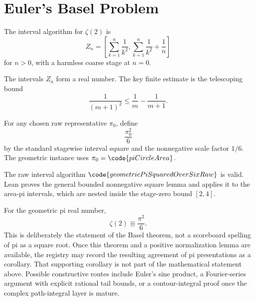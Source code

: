 \section{Euler's Basel Problem}

\begin{definition}\label{def:zeta-two-raw}
The interval algorithm for \(\zeta(2)\) is
\[
  Z_n=
  \left[
    \sum_{k=1}^{n}\frac1{k^2},
    \sum_{k=1}^{n}\frac1{k^2}+\frac1n
  \right]
\]
for \(n>0\), with a harmless coarse stage at \(n=0\).
\end{definition}

\begin{theorem}\label{thm:zeta-two-valid}
\leanok
The intervals \(Z_n\) form a real number.  The key finite estimate is the
telescoping bound
\[
  \frac{1}{(m+1)^2}\le \frac1m-\frac1{m+1}.
\]
\end{theorem}

\begin{definition}\label{def:basel-geometric-rhs}
For any chosen raw representative \(\pi_0\), define
\[
  \frac{\pi_0^2}{6}
\]
by the standard stagewise interval square and the nonnegative scale factor
\(1/6\).  The geometric instance uses \(\pi_0=\code{piCircleArea}\).
\end{definition}

\begin{theorem}
\label{thm:basel-geometric-rhs-valid}
\leanok
The raw interval algorithm \(\code{geometricPiSquaredOverSixRaw}\) is valid.
Lean proves the general bounded nonnegative square lemma and applies it to the
area-pi intervals, which are nested inside the stage-zero bound \([2,4]\).
\end{theorem}

\begin{conjecture}\label{conj:basel}
For the geometric pi real number,
\[
  \zeta(2)\Equiv \frac{\pi^2}{6}.
\]
This is deliberately the statement of the Basel theorem, not a scoreboard
spelling of pi as a square root.  Once this theorem and a positive
normalization lemma are available, the registry may record the resulting
agreement of pi presentations as a corollary.  That supporting corollary is
not part of the mathematical statement above.
Possible constructive routes include Euler's sine product, a Fourier-series
argument with explicit rational tail bounds, or a contour-integral proof once
the complex path-integral layer is mature.
\end{conjecture}
